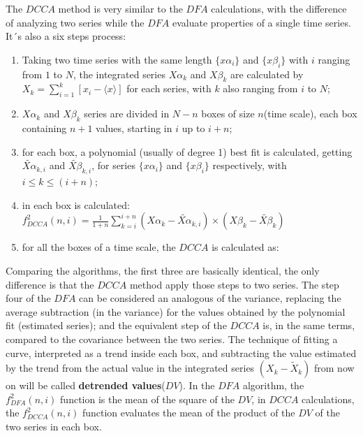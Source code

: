 \documentclass[article]{jss}
\begin{document}
The $DCCA$ method is very similar to the $DFA$ calculations, with the difference of analyzing two series while the $DFA$ evaluate properties of a single time series. It´s also a six steps process:


\begin{enumerate}
  \label{steps:DCCA}
  \item Taking two time series with the same length $\{x\alpha_{i}\}$ and $\{x\beta_{i}\}$ with $i$ ranging from $1$ to $N$,
        the integrated series $X\alpha_{k}$ and $X\beta_{k}$ are calculated by
        $X_{k} = \sum_{i=1}^{k}\left[x_{i} - \langle x \rangle \right] $ for each series, with $k$ also ranging from $i$ to $N$;
  \item $X\alpha_{k}$ and $X\beta_{k}$ series are divided in $N - n$ boxes of size $n$(time scale), each box containing $n + 1$ values, starting in $i$ up to $i + n$;
  \item for each box, a polynomial (usually of degree 1) best fit is calculated, getting
        $\widetilde{X\alpha}_{k, i}$ and $\widetilde{X\beta}_{k, i}$,
        for series $\{x\alpha_{i}\}$ and $\{x\beta_{i}\}$ respectively,
        with $i \le k \le (i + n)$;
  \item in each box is calculated: $f_{DCCA}^{2}(n, i) =
          \frac{1}{1+n} \sum_{k=i}^{i + n}(X\alpha_{k}-\widetilde{X\alpha}_{k, i}) \times (X\beta_{k}-\widetilde{X\beta}_{k})$
  \item for all the boxes of a time scale, the $DCCA$ is calculated as:\\[10pt]
\end{enumerate}

Comparing the algorithms, the first three are basically identical, the only difference is that the $DCCA$ method apply those steps to two series. The step four of the $DFA$ can be considered an analogous of the variance, replacing the average subtraction (in the variance) for the values obtained by the polynomial fit (estimated series); and the equivalent step of the $DCCA$ is, in the same terms, compared to the covariance between the two series. The technique of fitting a curve, interpreted as a trend inside each box, and subtracting the value estimated by the trend from the actual value in the integrated series $(X_{k}-\widetilde{X}_{k})$ from now on will be called \textbf{detrended values}($DV$). In the $DFA$ algorithm, the $f_{DFA}^{2}(n, i)$ function is the mean of the square of the $DV$, in $DCCA$ calculations, the $f_{DCCA}^{2}(n, i)$ function evaluates the mean of the product of the $DV$ of the two series in each box.
\end{document}

